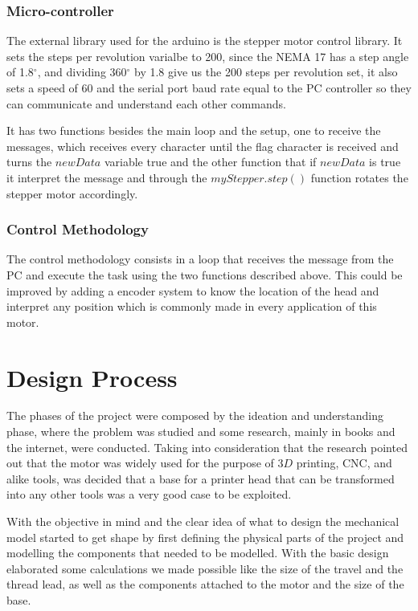\documentclass[transmag]{IEEEtran}
\begin{document}
\subsubsection{Micro-controller}


The external library used for the arduino is the stepper motor control library. It sets the steps per revolution varialbe to 200, since the NEMA 17 has a step angle of 1.8$^{\circ}$, and dividing 360$^{\circ}$ by 1.8 give us the 200 steps per revolution set, it also sets a speed of 60 and the serial port baud rate equal to the PC controller so they can communicate and understand each other commands.

It has two functions besides the main loop and the setup, one to receive the messages, which receives every character until the flag character is received and turns the $newData$ variable true and the other function that if $newData$ is true it interpret the message and through the $myStepper.step()$ function rotates the stepper motor accordingly. 

\subsubsection{Control Methodology}

The control methodology consists in a loop that receives the message from the PC and execute the task using the two functions described above. This could be improved by adding a encoder system to know the location  of the head and interpret any position which is commonly made in every application of this motor.


\section{Design Process}


The phases of the project were composed by the ideation and understanding phase, where the problem was studied and some research, mainly in books and the internet, were conducted. Taking into consideration that the research pointed out that the motor was widely used for the purpose of $3D$ printing, CNC, and alike tools, was decided that a base for a printer head that can be transformed into any other tools was a very good case to be exploited.

With the objective in mind and the clear idea of what to design the mechanical model started to get shape by first defining the physical parts of the project and modelling the components that needed to be modelled. With the basic design elaborated some calculations we made possible like the size of the travel and the thread lead, as well as the components attached to the motor and the size of the base.
\end{document}
